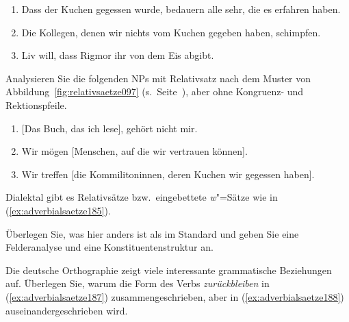 \begin{enumerate}
  \item Dass der Kuchen gegessen wurde, bedauern alle sehr, die es erfahren haben.
  \item Die Kollegen, denen wir nichts vom Kuchen gegeben haben, schimpfen.
  \item Liv will, dass Rigmor ihr von dem Eis abgibt.
\end{enumerate}

 \label{exc:saetze05} Analysieren Sie die folgenden NPs mit Relativsatz nach dem Muster von Abbildung~\ref{fig:relativsaetze097} (s.\ Seite~\pageref{fig:relativsaetze097}), aber ohne Kongruenz- und Rektionspfeile.

\begin{enumerate}
  \item{[Das Buch, das ich lese], gehört nicht mir.}
  \item Wir mögen [Menschen, auf die wir vertrauen können].
  \item Wir treffen [die Kommilitoninnen, deren Kuchen wir gegessen haben].
\end{enumerate}

 \label{exc:saetze06} Dialektal gibt es Relativsätze bzw.\ eingebettete \textit{w}"=Sätze wie in (\ref{ex:adverbialsaetze185}).

\begin{exe}
\end{exe}

Überlegen Sie, was hier anders ist als im Standard und geben Sie eine Felderanalyse und eine Konstituentenstruktur an.

 \label{exc:saetze07} Die deutsche Orthographie zeigt viele interessante grammatische Beziehungen auf.
Überlegen Sie, warum die Form des Verbs \textit{zurückbleiben} in (\ref{ex:adverbialsaetze187}) zusammengeschrieben, aber in (\ref{ex:adverbialsaetze188}) auseinandergeschrieben wird.

\begin{exe}
  \ex\label{ex:adverbialsaetze186}
  \begin{xlist}
  \end{xlist}
\end{exe}

